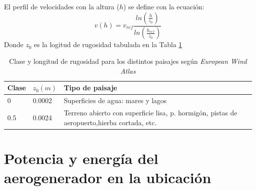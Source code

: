 \documentclass[12pt]{report}
\begin{document}


El perfil de velocidades con la altura ($h$) se define con la ecuación:
\begin{equation}
    v(h) = v_{ref} \frac{ln \left( \frac{h}{z_0} \right)}{ln \left( \frac{h_{ref}}{z_0} \right)}
\end{equation}
Donde $z_0$ es la logitud de rugosidad tabulada en la Tabla \ref{Tabla: Clase y longitud de rugosidad.}

\begin{table}[H]
    \centering
    \begin{tabular}{l l p{13cm}}
        \hline
        Clase & $z_0(m)$ & Tipo de paisaje \\
        \hline
        0 & 0.0002 & Superficies de agua: mares y lagos \\
        0.5 & 0.0024 & Terreno abierto con superficie lisa, p. hormigón, pistas de aeropuerto,hierba cortada, etc. \\
        \hline
    \end{tabular}
    
    \caption{Clase y longitud de rugosidad para los distintos paisajes según \textit{European Wind Atlas}}
    \label{Tabla: Clase y longitud de rugosidad.}
\end{table}

\section{Potencia y energía del aerogenerador en la ubicación}


\end{document}
